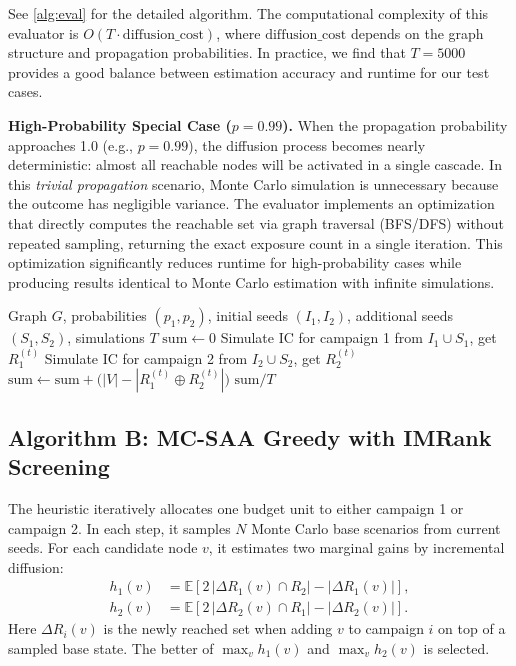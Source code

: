 \documentclass[onecolumn,a4paper,12pt]{IEEEtran}
\begin{document}
See \ref{alg:eval} for the detailed algorithm. The computational complexity of this evaluator is $O(T \cdot \text{diffusion\_cost})$, where $\text{diffusion\_cost}$ depends on the graph structure and propagation probabilities. In practice, we find that $T=5000$ provides a good balance between estimation accuracy and runtime for our test cases.

\textbf{High-Probability Special Case ($p=0.99$).} When the propagation probability approaches 1.0 (e.g., $p=0.99$), the diffusion process becomes nearly deterministic: almost all reachable nodes will be activated in a single cascade. In this \textit{trivial propagation} scenario, Monte Carlo simulation is unnecessary because the outcome has negligible variance. The evaluator implements an optimization that directly computes the reachable set via graph traversal (BFS/DFS) without repeated sampling, returning the exact exposure count in a single iteration. This optimization significantly reduces runtime for high-probability cases while producing results identical to Monte Carlo estimation with infinite simulations.
 
\begin{algorithm}[h]
\caption{Monte Carlo IC Evaluation}
\label{alg:eval}
\begin{algorithmic}[1]
\Require Graph $G$, probabilities $(p_1,p_2)$, initial seeds $(I_1,I_2)$, additional seeds $(S_1,S_2)$, simulations $T$
\State $\text{sum}\gets 0$
                \State Simulate IC for campaign 1 from $I_1\cup S_1$, get $R_1^{(t)}$
                \State Simulate IC for campaign 2 from $I_2\cup S_2$, get $R_2^{(t)}$
                \State $\text{sum}\gets \text{sum} + \big(|V|-|R_1^{(t)}\oplus R_2^{(t)}|\big)$
\EndFor
\State \Return $\text{sum}/T$
\end{algorithmic}
\end{algorithm}

\subsection{Algorithm B: MC-SAA Greedy with IMRank Screening}
The heuristic iteratively allocates one budget unit to either campaign 1 or campaign 2. In each step, it samples $N$ Monte Carlo base scenarios from current seeds. For each candidate node $v$, it estimates two marginal gains by incremental diffusion:
\begin{align}
h_1(v) &= \mathbb{E}\left[2\,|\Delta R_1(v)\cap R_2| - |\Delta R_1(v)|\right],\\
h_2(v) &= \mathbb{E}\left[2\,|\Delta R_2(v)\cap R_1| - |\Delta R_2(v)|\right].
\end{align}
Here $\Delta R_i(v)$ is the newly reached set when adding $v$ to campaign $i$ on top of a sampled base state. The better of $\max_v h_1(v)$ and $\max_v h_2(v)$ is selected.
\end{document}
